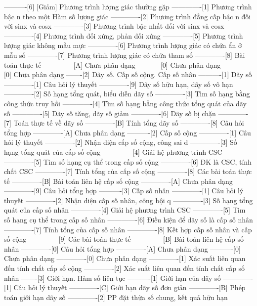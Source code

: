 ----------[6] [Giảm] Phương trình lượng giác thường gặp
-------------[1] Phương trình bậc n theo một Hàm số lượng giác
-------------[2] Phương trình đẳng cấp bậc n đối với sinx và cosx
-------------[3] Phương trình bậc nhất đối với sinx và cosx
-------------[4] Phương trình đối xứng, phản đối xứng
-------------[5] Phương trình lượng giác không mẫu mực
-------------[6] Phương trình lượng giác có chứa ẩn ở mẫu số
-------------[7] Phương trình lượng giác có chứa tham số
-------------[8] Bài toán thực tế
-------------[A] Chưa phân dạng
----------[0] Chưa phân dạng
-------------[0] Chưa phân dạng
-------[2] Dãy số. Cấp số cộng. Cấp số nhân
----------[1] Dãy số
-------------[1] Câu hỏi lý thuyết
-------------[9] Dãy số hữu hạn, dãy số vô hạn
-------------[2] Số hạng tổng quát, biểu diễn dãy số
-------------[3] Tìm số hạng bằng công thức truy hồi
-------------[4] Tìm số hạng bằng công thức tổng quát của dãy số
-------------[5] Dãy số tăng, dãy số giảm
-------------[6] Dãy số bị chặn
-------------[7] Toán thực tế về dãy số
-------------[B] Tính tổng dãy số
-------------[8] Câu hỏi tổng hợp
-------------[A] Chưa phân dạng
----------[2] Cấp số cộng
-------------[1] Câu hỏi lý thuyết
-------------[2] Nhận diện cấp số cộng, công sai d
-------------[3] Số hạng tổng quát của cấp số cộng
-------------[4] Giải hệ phương trình CSC
-------------[5] Tìm số hạng cụ thể trong cấp số cộng
-------------[6] ĐK là CSC, tính chất CSC
-------------[7] Tính tổng của cấp số cộng
-------------[8] Các bài toán thực tế
-------------[B] Bài toán liên hệ cấp số cộng
-------------[A] Chưa phân dạng
-------------[9] Câu hỏi tổng hợp
----------[3] Cấp số nhân
-------------[1] Câu hỏi lý thuyết
-------------[2] Nhận diện cấp số nhân, công bội q
-------------[3] Số hạng tổng quát của cấp số nhân
-------------[4] Giải hệ phương trình CSC
-------------[5] Tìm số hạng cụ thể trong cấp số nhân
-------------[6] Điều kiện để dãy số là cấp số nhân
-------------[7] Tính tổng của cấp số nhân
-------------[8] Kết hợp cấp số nhân và cấp số cộng
-------------[9] Các bài toán thực tế
-------------[B] Bài toán liên hệ cấp số nhân
-------------[0] Câu hỏi tổng hợp
-------------[A] Chưa phân dạng
----------[0] Chưa phân dạng
-------------[0] Chưa phân dạng
-------------[1] Xác suất liên quan đến tính chất cấp số cộng
-------------[2] Xác suất liên quan đến tính chất cấp số nhân
-------[3] Giới hạn. Hàm số liên tục
----------[1] Giới hạn của dãy số
-------------[1] Câu hỏi lý thuyết
-------------[C] Giới hạn dãy số đơn giản
-------------[B] Phép toán giới hạn dãy số
-------------[2] PP đặt thừa số chung, kết quả hữu hạn
